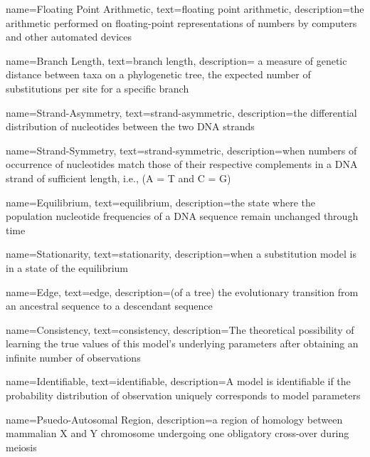 \makeglossaries

{
        name=Floating Point Arithmetic,
        text=floating point arithmetic,
        description={the arithmetic performed on floating-point representations of numbers by computers and other automated devices}
}


{
        name=Branch Length,
        text=branch length,
        description={ a measure of genetic distance between taxa on a phylogenetic tree, the expected number of substitutions per site for a specific branch}
}


{
        name=Strand-Asymmetry,
        text={strand-asymmetric},
        description={the differential distribution of nucleotides between the two DNA strands}
}

{
        name=Strand-Symmetry,
        text=strand-symmetric,
        description={when numbers of occurrence of nucleotides match those of their respective complements in a DNA strand of sufficient length, i.e., (A = T and C = G)}
}


{
        name=Equilibrium,
        text=equilibrium,
        description={the state where the population nucleotide frequencies of a DNA sequence remain unchanged through time}
}

{
        name=Stationarity,
        text=stationarity,
        description={when a substitution model is in a state of the \gls{equilibrium}}
}


{
        name=Edge,
        text=edge,
        description={(of a tree) the evolutionary transition from an ancestral sequence to a descendant sequence}
}

{
        name=Consistency,
        text=consistency,
        description={The theoretical possibility of learning the true values of this model's underlying parameters after obtaining an infinite number of observations}
}

{
        name=Identifiable,
        text=identifiable,
        description={A model is identifiable if the probability distribution of observation uniquely corresponds to model parameters}
}


{
        name=Psuedo-Autosomal Region,
        description={a region of homology between mammalian X and Y chromosome undergoing one obligatory cross-over during meiosis}
}

